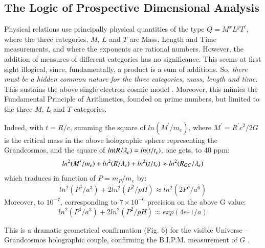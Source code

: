 \documentclass[twoside,draft]{article}
\begin{document}
\begin{sloppypar}
{\subsection{The Logic of Prospective Dimensional Analysis}

Physical relations use principally physical quantities of the type $Q = M^{x} L^{y} T^{t}$, where
the three categories, $M$, $L$ and $T$ are Mass, Length and Time measurements, and where the exponents are
rational numbers. However, the addition of measures of different categories has no significance.
This seems at first sight illogical, since, fundamentally, a product is a sum of additions. So, \textit{there
must be a hidden common nature for the three categories, mass, length and time}. This sustains the
above single electron cosmic model \cite{Sanchez1}. Moreover, this mimics the Fundamental Principle of
Arithmetics, founded on prime numbers, but limited to the three $M$, $L$ and $T$ categories. 

Indeed, with $t =
R/c$, summing the square of $ln(M^{\prime}/m_{e} )$, where $M^{\prime} = R^{\prime} c^{2} /2G$ is the critical mass in the above
holographic sphere representing the Grandcosmos, and the square of $ln(R/\lambdabar_{e} ) = ln(t/t_{e} )$, one gets, to 40 ppm:
\begin{equation}
ln^{2} (M^{\prime}/m_{e} ) + ln^{2} (R/\lambdabar_{e}) + ln^2 (t/t_{e} ) \approx ln^2 (R_{GC} /\lambdabar_{e} )
\end{equation} which traduces in function of $P = m_P/m_e$ by:
\begin{equation}
ln^2(P^4/a^3) + 2 ln^2(P^2/pH) \approx ln^2(2P^5/a^6)
\end{equation}
Moreover, to $10^{-7}$, corresponding to $7 \times 10^{-6}$ precision on the above G value:
\begin{equation}
ln^2(P^4/a^3) + 2 ln^2(P^2/pH) \approx exp(4e – 1/a)
\end{equation}
 
This is a dramatic geometrical confirmation (Fig. 6) for the visible Universe – Grandcosmos holographic couple, confirming the B.I.P.M. measurement of $G$ \cite{Quinn}.


}
\end{sloppypar}
\end{document}
